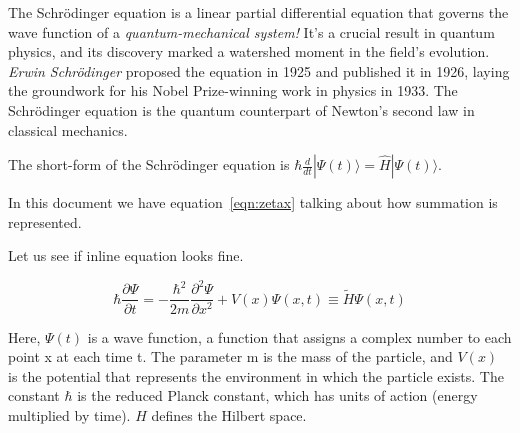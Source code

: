 %









The Schrödinger equation is a linear partial differential equation that governs the wave function of a  {\color{blue}\textit{quantum-mechanical system!}} It's a crucial result in quantum physics, and its discovery marked a watershed moment in the field's evolution. {\color{blue}\textit{Erwin Schrödinger}}  proposed the equation in 1925 and published it in 1926, laying the groundwork for his Nobel Prize-winning work in physics in 1933.  The Schrödinger equation is the quantum counterpart of Newton's second law in classical mechanics.





\setlength{\parindent}{10ex}
The short-form of the Schrödinger equation is $\hbar \frac{d}{d t}|\Psi(t)\rangle=\hat{H}|\Psi(t)\rangle$. \par
\noindent %
In this document we have equation~\ref{eqn:zetax} talking about how summation is represented. 



  



\noindent Let us see if inline equation looks fine.

\begin{equation}
    \hbar \frac{\partial \Psi}{\partial t}=-\frac{\hbar^{2}}{2 m} \frac{\partial^{2} \Psi}{\partial x^{2}}+V(x) \Psi(x, t) \equiv \tilde{H} \Psi(x, t)
        \label{eqn:zetax}
\end{equation}



\noindent Here, $\Psi(t)$ is a wave function, a function that assigns a complex number to each point x at each time t. The parameter m is the mass of the particle, and $V(x) $ is the potential that represents the environment in which the particle exists. The constant $\hbar$  is the reduced Planck constant, which has units of action (energy multiplied by time). $\hat{H}$ defines the Hilbert space.


% 
